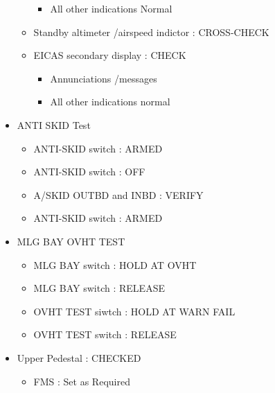 \begin{itemize}
\begin{itemize}
\begin{itemize}
\item All other indications Normal

\end{itemize}

\item Standby altimeter \slash  airspeed indictor : CROSS-CHECK

\item EICAS secondary display : CHECK

\begin{itemize}
\item Annunciations \slash  messages

\item All other indications normal

\end{itemize}

\end{itemize}

\item ANTI SKID Test

\begin{itemize}
\item ANTI-SKID switch : ARMED

\item ANTI-SKID switch : OFF

\item A\slash SKID OUTBD and INBD : VERIFY

\item ANTI-SKID switch : ARMED

\end{itemize}

\item MLG BAY OVHT TEST

\begin{itemize}
\item MLG BAY switch : HOLD AT OVHT

\item MLG BAY switch : RELEASE

\item OVHT TEST siwtch : HOLD AT WARN FAIL

\item OVHT TEST switch : RELEASE

\end{itemize}

\item Upper Pedestal : CHECKED

\begin{itemize}
\item FMS : Set as Required


\end{itemize}
\end{itemize}
